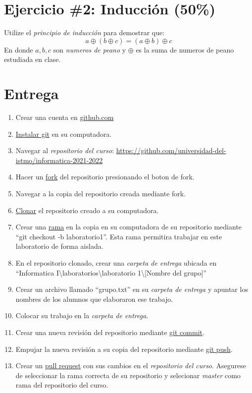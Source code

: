 \documentclass{article}
\begin{document}
\section*{Ejercicio \#2: Inducci\'on (50\%)}

Utilize el \emph{principio de inducci\'on} para demostrar que:
\[
    a \oplus (b \oplus c) = (a \oplus b) \oplus c 
\]
En donde $a, b, c$ son \emph{numeros de peano} y $\oplus$ es la
suma de numeros de peano estudiada en clase.

\section*{Entrega}

\begin{enumerate}
\item{Crear una cuenta en \url{github.com}}
\item{\href{https://github.com/git-guides/install-git}{Instalar git} en su computadora.}
\item{Navegar al \emph{repositorio del curso}: \url{https://github.com/universidad-del-istmo/informatica-2021-2022}}
\item{Hacer un \href{https://docs.github.com/en/get-started/quickstart/fork-a-repo}{fork} del
repositorio presionando el boton de fork.}
\item{Navegar a la copia del repositorio creada mediante fork.}
\item{\href{https://docs.github.com/en/github/creating-cloning-and-archiving-repositories/cloning-a-repository-from-github/cloning-a-repository}{Clonar} el
repositorio creado a su computadora.}
\item{Crear una \href{https://docs.github.com/en/github/collaborating-with-pull-requests/proposing-changes-to-your-work-with-pull-requests/about-branches}{rama} en
la copia en su computadora de su repositorio mediante ``git checkout -b laboratorio1''. Esta
rama permitira trabajar en este laboratorio de forma aislada.}
\item{En el repositorio clonado, crear una \emph{carpeta de entrega} ubicada en ``Informatica I\textbackslash laboratorios\textbackslash laboratorio 1\textbackslash [Nombre del grupo]''}
\item{Crear un archivo llamado ``grupo.txt'' en su \emph{carpeta de entrega} y apuntar los nombres
de los alumnos que elaboraron ese trabajo.}
\item{Colocar su trabajo en la \emph{carpeta de entrega}.}
\item{Crear una nueva revisi\'on del repositorio mediante \href{https://github.com/git-guides/git-commit}{git commit}.}
\item{Empujar la nueva revisi\'on a su copia del repositorio mediante \href{https://github.com/git-guides/git-push}{git push}.}
\item{Crear un \href{https://docs.github.com/en/github/collaborating-with-pull-requests/proposing-changes-to-your-work-with-pull-requests/about-pull-requests}{pull request} con sus cambios en el \emph{repositorio del curso}.
Asegurese de seleccionar la rama correcta de su repositorio y selecionar \emph{master} como
rama del repositorio del curso.}
\end{enumerate}
\end{document}
